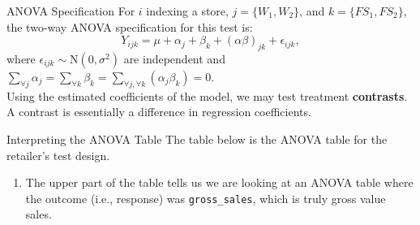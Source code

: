 \documentclass[pdf]{beamer}
\newcommand{\empr}[1]{{\color{franklinblue}\textbf{#1}}}
\theoremstyle{remark}
\theoremstyle{definition}
\begin{document}

\begin{frame}[t]{ANOVA Specification}
For $i$ indexing a store, $j=\{W_1,W_2\}$, and $k=\{FS_1,FS_2\}$, the two-way ANOVA specification for this test is: \\
\vspace{-1.0ex}
\begin{equation}
Y_{ijk} = \mu + \alpha_j + \beta_k + (\alpha\beta)_{jk} + \epsilon_{ijk},
\end{equation}
where $\epsilon_{ijk} \sim \text{N}(0,\sigma^2)$ are independent and $\sum_{\forall j} \alpha_j = \sum_{\forall k} \beta_k = \sum_{\forall j, \forall k}(\alpha_j \beta_k) = 0$. \\
\vspace{1.5ex}
Using the estimated coefficients of the model, we may test treatment \empr{contrasts}. \\
\vspace{1.5ex}
A contrast is essentially a difference in regression coefficients.
\end{frame}

\begin{frame}[t]{Interpreting the ANOVA Table}
The table below is the ANOVA table for the retailer's test design. \\
\small

\normalfont
\begin{enumerate}
  \item The upper part of the table tells us we are looking at an ANOVA table where the outcome (i.e., response) was \texttt{gross\_sales}, which is truly gross value sales.
\end{enumerate}
\end{frame}
\end{document}
